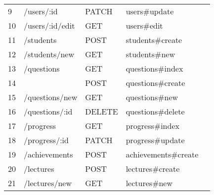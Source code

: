 \begin{table}[]
\begin{tabular}{lllll}
\multicolumn{1}{|l|}{9}   & \multicolumn{1}{l|}{/users/:id}          & \multicolumn{1}{l|}{PATCH}  & \multicolumn{1}{l|}{users\#update}            &  \\ \cline{1-4}
\multicolumn{1}{|l|}{10}  & \multicolumn{1}{l|}{/users/:id/edit}     & \multicolumn{1}{l|}{GET}    & \multicolumn{1}{l|}{users\#edit}              &  \\ \cline{1-4}
\multicolumn{1}{|l|}{11}  & \multicolumn{1}{l|}{/students}           & \multicolumn{1}{l|}{POST}   & \multicolumn{1}{l|}{students\#create}         &  \\ \cline{1-4}
\multicolumn{1}{|l|}{12}  & \multicolumn{1}{l|}{/students/new}       & \multicolumn{1}{l|}{GET}    & \multicolumn{1}{l|}{students\#new}            &  \\ \cline{1-4}
\multicolumn{1}{|l|}{13}  & \multicolumn{1}{l|}{/questions}          & \multicolumn{1}{l|}{GET}    & \multicolumn{1}{l|}{questions\#index}         &  \\ \cline{1-4}
\multicolumn{1}{|l|}{14}  & \multicolumn{1}{l|}{}                    & \multicolumn{1}{l|}{POST}   & \multicolumn{1}{l|}{questions\#create}        &  \\ \cline{1-4}
\multicolumn{1}{|l|}{15}  & \multicolumn{1}{l|}{/questions/new}      & \multicolumn{1}{l|}{GET}    & \multicolumn{1}{l|}{questions\#new}           &  \\ \cline{1-4}
\multicolumn{1}{|l|}{16}  & \multicolumn{1}{l|}{/questions/:id}      & \multicolumn{1}{l|}{DELETE} & \multicolumn{1}{l|}{questions\#delete}        &  \\ \cline{1-4}
\multicolumn{1}{|l|}{17}  & \multicolumn{1}{l|}{/progress}           & \multicolumn{1}{l|}{GET}    & \multicolumn{1}{l|}{progress\#index}          &  \\ \cline{1-4}
\multicolumn{1}{|l|}{18}  & \multicolumn{1}{l|}{/progress/:id}       & \multicolumn{1}{l|}{PATCH}  & \multicolumn{1}{l|}{progress\#update}         &  \\ \cline{1-4}
\multicolumn{1}{|l|}{19}  & \multicolumn{1}{l|}{/achievements}       & \multicolumn{1}{l|}{POST}   & \multicolumn{1}{l|}{achievements\#create}     &  \\ \cline{1-4}
\multicolumn{1}{|l|}{20}  & \multicolumn{1}{l|}{/lectures}           & \multicolumn{1}{l|}{POST}   & \multicolumn{1}{l|}{lectures\#create}         &  \\ \cline{1-4}
\multicolumn{1}{|l|}{21}  & \multicolumn{1}{l|}{/lectures/new}       & \multicolumn{1}{l|}{GET}    & \multicolumn{1}{l|}{lectures\#new}            &  \\ \cline{1-4}

\end{tabular}
\end{table}
